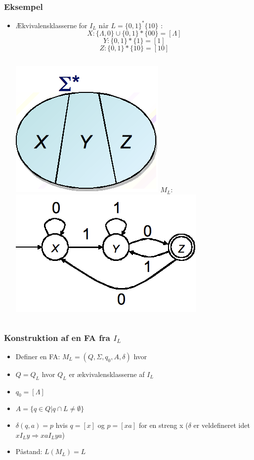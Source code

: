 \documentclass[]{beamer}
\begin{document}
\begin{frame}
\frametitle{Eksempel}
\begin{itemize}[<+->]
\item Ækvivalensklasserne for $I_L$ når $L = \{0,1\}^*\{10\}$ :
\[X:  \{\Lambda , 0\} \cup \{0,1\}*\{00\} = [\Lambda ]\]
\[Y:  \{0,1\}*\{1\} = [1]\]
\[Z:  \{0,1\}*\{10\} = [10]\]
\begin{columns}
\column{5cm}
\includegraphics[scale=0.4]{images/2_seminar_equivclassessigma}
\pause
\column{5cm}
$M_L$:\includegraphics[scale=0.4]{images/2_seminar_myhillfa}
\end{columns}
\end{itemize}
\end{frame}

\begin{frame}
\frametitle{Konstruktion af en FA fra $I_L$}
\begin{itemize}[<+->]
\item Definer en FA: 
	$M_L=(Q, \Sigma , q_0, A, \delta)$ hvor
\item $Q = Q_L$    hvor $Q_L$ er ækvivalensklasserne af $I_L$
\item $q_0 = [\Lambda ]$
\item $A = \{ q\in Q | q \cap L \neq  \emptyset \}$
\item $\delta (q, a) = p$   hvis $q=[x]$ og $p=[xa]$ for en streng x
	($\delta$  er veldefineret idet  $x I_L y \Rightarrow  xa I_L ya$)
\item
Påstand: $L(M_L) = L$
\end{itemize}
\end{frame}
\end{document}

